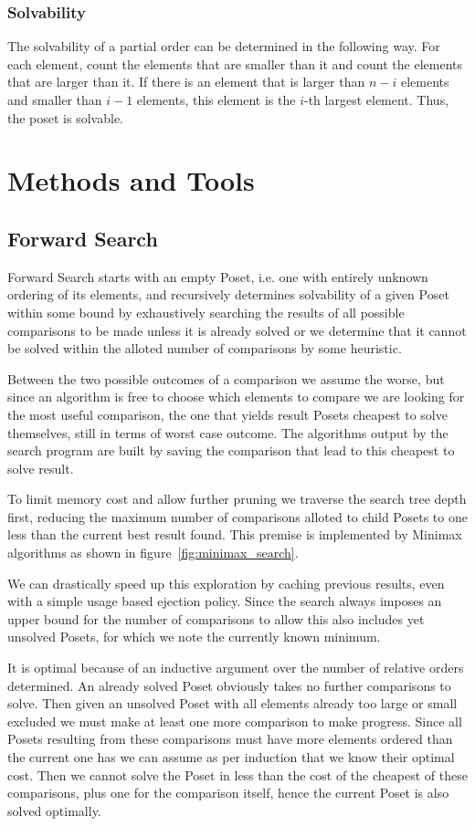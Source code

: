 \documentclass[10pt,journal,compsoc]{IEEEtran}
\begin{document}
\subsubsection{Solvability}
The solvability of a partial order can be determined in the following way. For each element, count
the elements that are smaller than it and count the elements that are larger than it. If there is an
element that is larger than $n-i$ elements and smaller than $i-1$ elements, this element is the
$i$-th largest element. Thus, the poset is solvable.


\section{Methods and Tools}
\subsection{Forward Search}
Forward Search starts with an empty Poset, i.e. one with entirely unknown ordering of its elements,
and recursively determines solvability of a given Poset within some bound by exhaustively searching
the results of all possible comparisons to be made unless it is already solved or we determine that
it cannot be solved within the alloted number of comparisons by some heuristic.

Between the two possible outcomes of a comparison we assume the worse, but since an algorithm is
free to choose which elements to compare we are looking for the most useful comparison, the one that
yields result Posets cheapest to solve themselves, still in terms of worst case outcome. The
algorithms output by the search program are built by saving the comparison that lead to this
cheapest to solve result.

To limit memory cost and allow further pruning we traverse the search tree depth first, reducing the
maximum number of comparisons alloted to child Posets to one less than the current best result
found. This premise is implemented by Minimax algorithms as shown in
figure~\ref{fig:minimax_search}.

We can drastically speed up this exploration by caching previous results, even with a simple usage
based ejection policy. Since the search always imposes an upper bound for the number of comparisons
to allow this also includes yet unsolved Posets, for which we note the currently known minimum.

It is optimal because of an inductive argument over the number of relative orders determined. An
already solved Poset obviously takes no further comparisons to solve. Then given an unsolved Poset
with all elements already too large or small excluded we must make at least one more comparison to
make progress. Since all Posets resulting from these comparisons must have more elements ordered
than the current one has we can assume as per induction that we know their optimal cost. Then we
cannot solve the Poset in less than the cost of the cheapest of these comparisons, plus one for the
comparison itself, hence the current Poset is also solved optimally.
\end{document}
